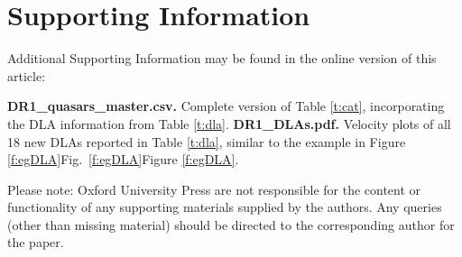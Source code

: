 \documentclass[fleqn,usenatbib,usedcolumn]{mnras}
\newcommand{\Tref}[1]{Table \ref{#1}}
\newcommand{\Fref}[1]{\ifhmode \ifnum\spacefactor=1001 Figure \ref{#1}\else Fig.\ \ref{#1}\fi \else Figure \ref{#1}\fi}
\begin{document}







\section*{Supporting Information}\label{sec:supp}

Additional Supporting Information may be found in the online version
of this article:\vspace{-0.5em}\newline

\noindent \textbf{DR1\_quasars\_master.csv.} Complete version of \Tref{t:cat}, incorporating the DLA information from \Tref{t:dla}.\vspace{-0.1em}\newline
\noindent \textbf{DR1\_DLAs.pdf.} Velocity plots of all 18 new DLAs reported in \Tref{t:dla}, similar to the example in \Fref{f:egDLA}.\vspace{-0.5em}\newline

\noindent Please note: Oxford University Press are not responsible for the
content or functionality of any supporting materials supplied by
the authors. Any queries (other than missing material) should be
directed to the corresponding author for the paper.


\bsp	%
\label{lastpage}
\end{document}
